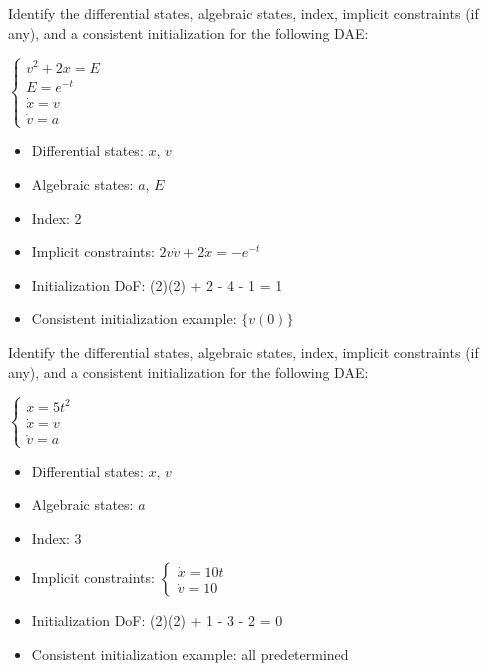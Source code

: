 \begin{exercise}
Identify the differential states, algebraic states, index, implicit constraints (if any), and a consistent initialization for the following DAE:

$\displaystyle \begin{cases}
    v^2 + 2x = E \\
    E = e^{-t} \\
    \dot{x} = v \\
    \dot{v} = a
    \end{cases}$
\end{exercise}
\begin{solution}
\begin{itemize}
    \item Differential states: $x$, $v$
    \item Algebraic states: $a$, $E$
    \item Index: 2
    \item Implicit constraints: $2 v \dot v + 2 \dot x = - e ^{-t}$
    \item Initialization DoF: (2)(2) + 2 - 4 - 1 = 1
    \item Consistent initialization example: $\{ v(0) \}$
\end{itemize}
\end{solution}
\begin{exercise}
Identify the differential states, algebraic states, index, implicit constraints (if any), and a consistent initialization for the following DAE:

$\displaystyle \begin{cases}
    x = 5t^2 \\
    \dot{x} = v \\
    \dot{v} = a
    \end{cases}$
\end{exercise}
\begin{solution}
\begin{itemize}
    \item Differential states: $x$, $v$
    \item Algebraic states: $a$
    \item Index: 3
    \item Implicit constraints: $\begin{cases} \dot x = 10t \\ \dot v = 10 \end{cases}$
    \item Initialization DoF: (2)(2) + 1 - 3 - 2 = 0
    \item Consistent initialization example: all predetermined
\end{itemize}
\end{solution}
